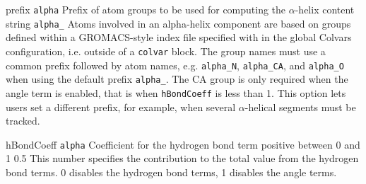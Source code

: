 \begin{cvcoptions}
  \item %
  \keydef
    {prefix}{%
      \texttt{alpha}}{%
      Prefix of atom groups to be used for computing the $\alpha$-helix content}{%
      string}{%
      \texttt{alpha\_}}{%
    Atoms involved in an alpha-helix component are based on groups defined within a
    GROMACS-style index file specified with  in the global
    Colvars configuration, i.e. outside of a \texttt{colvar} block.
    The group names must use a common prefix followed by atom names, e.g. \texttt{alpha\_N}, \texttt{alpha\_CA},
    and \texttt{alpha\_O} when using the default prefix \texttt{alpha\_}.
    The CA group is only required when the angle term is enabled, that is when \texttt{hBondCoeff} is less than 1.
    This option lets users set a different prefix, for example, when several $\alpha$-helical segments
    must be tracked.}


\item %
  \keydef
    {hBondCoeff}{%
    \texttt{alpha}}{%
    Coefficient for the hydrogen bond term}{%
    positive between 0 and 1}{%
    0.5}{%
    This number specifies the contribution to the total value from the
    hydrogen bond terms.  0 disables the hydrogen bond terms, 1
    disables the angle terms.}


\end{cvcoptions}
